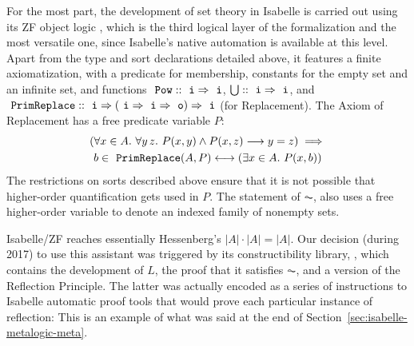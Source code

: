 For the most part, the development of set theory in Isabelle is
carried out using its ZF object logic
\cite{DBLP:journals/jar/PaulsonG96}, which is the third logical layer
of the formalization and the most versatile one, since 
Isabelle's native automation is available at this level. Apart from
the type and sort
declarations detailed above, it features a finite axiomatization,
with a predicate for membership, constants for the empty set and an
infinite set, and functions $\isatt{Pow}::\tyi\fun\tyi$,
$\union::\tyi\fun\tyi$, and $\isatt{PrimReplace} :: \tyi \fun (\tyi
\fun \tyi \fun\tyo)\fun \tyi$ (for Replacement). The Axiom of
Replacement
has a free predicate variable $P$: %
\begin{multline*}
  (\forall x \in A .\ \forall y\, z.\ P(x, y) \wedge P(x, z)
  \longrightarrow y=z) \implies \\
  b \in \isatt{PrimReplace}(A, P)
  \longleftrightarrow(\exists x \in A .\ P(x, b)) 
\end{multline*}
The restrictions on sorts described above ensure that it is not
possible that higher-order quantification gets used in $P$. The
statement of $\AC$, also uses a free higher-order variable to denote
an indexed family of nonempty sets. %

Isabelle/ZF reaches essentially Hessenberg's $|A|\cdot|A| = |A|$. Our decision
(during 2017) to
use this assistant was triggered by its constructibility
library,  \citep{paulson_2003},
which contains the development of $L$, the proof that it satisfies
$\AC$, and a version of the Reflection Principle. The latter was
actually encoded as a series of instructions to Isabelle automatic
proof tools that would prove each particular instance of reflection:
This is an example of what was said at the end of Section~\ref{sec:isabelle-metalogic-meta}.

